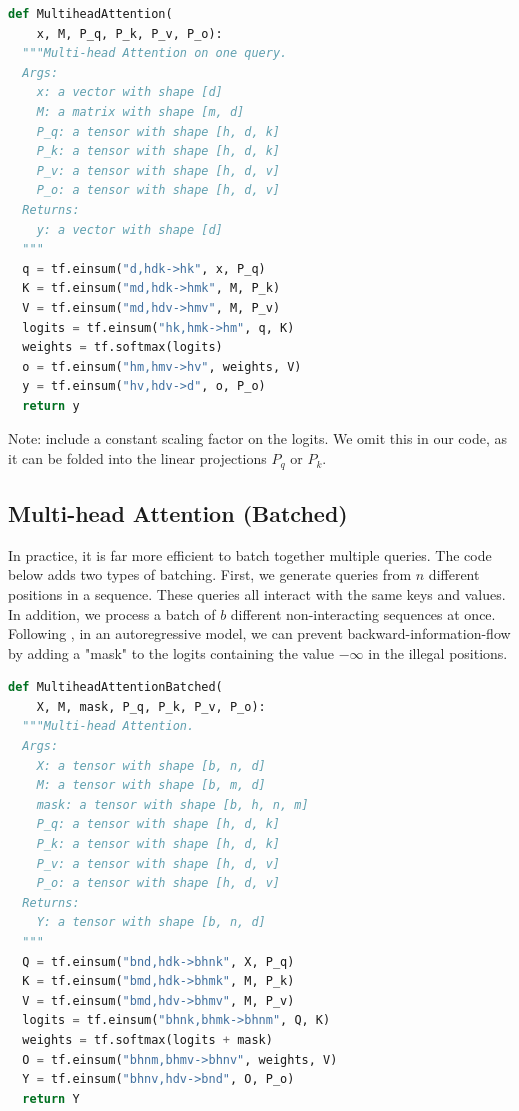 \documentclass{article}
\begin{document}
\begin{minipage}{\linewidth}
\begin{lstlisting}[language=Python]
def MultiheadAttention(
    x, M, P_q, P_k, P_v, P_o):
  """Multi-head Attention on one query.
  Args:
    x: a vector with shape [d]
    M: a matrix with shape [m, d]
    P_q: a tensor with shape [h, d, k]
    P_k: a tensor with shape [h, d, k]
    P_v: a tensor with shape [h, d, v]
    P_o: a tensor with shape [h, d, v]
  Returns:
    y: a vector with shape [d]
  """
  q = tf.einsum("d,hdk->hk", x, P_q)
  K = tf.einsum("md,hdk->hmk", M, P_k)
  V = tf.einsum("md,hdv->hmv", M, P_v)
  logits = tf.einsum("hk,hmk->hm", q, K)
  weights = tf.softmax(logits)
  o = tf.einsum("hm,hmv->hv", weights, V)
  y = tf.einsum("hv,hdv->d", o, P_o)
  return y
\end{lstlisting}
\end{minipage}

Note: \citep{Vas17} include a constant scaling factor on the logits.  We omit this in our code, as it can be folded into the linear projections $P_q$ or $P_k$.  

\subsection{Multi-head Attention (Batched)} \label{sec:mhab}
In practice, it is far more efficient to batch together multiple queries.  The code below adds two types of batching.  First, we generate queries from $n$ different positions in a sequence.  These queries all interact with the same keys and values.   In addition, we process a batch of $b$ different non-interacting sequences at once.  Following \citep{Vas17}, in an autoregressive model, we can prevent backward-information-flow by adding a "mask" to the logits containing the value $-\infty$ in the illegal positions.  

\begin{minipage}{\linewidth}
\begin{lstlisting}[language=Python]
def MultiheadAttentionBatched(
    X, M, mask, P_q, P_k, P_v, P_o):
  """Multi-head Attention.
  Args:
    X: a tensor with shape [b, n, d]
    M: a tensor with shape [b, m, d]
    mask: a tensor with shape [b, h, n, m]
    P_q: a tensor with shape [h, d, k]
    P_k: a tensor with shape [h, d, k]
    P_v: a tensor with shape [h, d, v]
    P_o: a tensor with shape [h, d, v]
  Returns:
    Y: a tensor with shape [b, n, d]
  """
  Q = tf.einsum("bnd,hdk->bhnk", X, P_q)
  K = tf.einsum("bmd,hdk->bhmk", M, P_k)
  V = tf.einsum("bmd,hdv->bhmv", M, P_v)
  logits = tf.einsum("bhnk,bhmk->bhnm", Q, K)
  weights = tf.softmax(logits + mask)
  O = tf.einsum("bhnm,bhmv->bhnv", weights, V)
  Y = tf.einsum("bhnv,hdv->bnd", O, P_o)
  return Y
\end{lstlisting}
\end{minipage}
\end{document}
